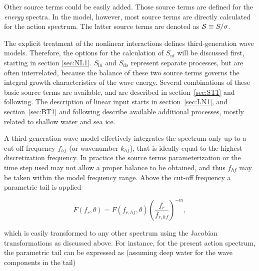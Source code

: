 \noindent
Other source terms could be easily added. Those source terms are defined for the
{\em energy} spectra. In the model, however, most source terms are directly
calculated for the action spectrum. The latter source terms are denoted as
${\cal S} \equiv S/\sigma$.

The explicit treatment of the nonlinear interactions defines third-generation wave
models. Therefore, the options for the calculation of $S_{\mathrm  nl}$ will be
discussed first, starting in section \ref{sec:NL1}. $S_{\mathrm  in}$ and $S_{\mathrm ds}$
represent separate processes, but are often interrelated,
because the balance of these two source terms governs the integral growth
characteristics of the wave energy. Several combinations of these basic source
terms are available, and are described in section~\ref{sec:ST1} and following.
The description of linear input starts in section~\ref{sec:LN1}, and
section~\ref{sec:BT1} and following describe available additional processes, mostly
related to shallow water and sea ice. 


A third-generation wave model effectively integrates the spectrum only up to a
cut-off frequency $f_{hf}$ (or wavenumber $k_{hf}$), that is ideally equal to the 
highest discretization frequency. In practice the source terms parameterization or the time step used may not allow a proper 
balance to be obtained, and thus $f_{hf}$  may be taken within the model frequency range. Above the cut-off frequency a
parametric tail is applied \citep[e.g.,][]{art:WAM88}


\begin{equation}
F(f_r,\theta) = F(f_{r,hf},\theta) \left ( \frac{f_r}{f_{r,hf}}
\right ) ^{-m} \label{eq:tail_E_f} ,
\end{equation}

\noindent
which is easily transformed to any other spectrum using the Jacobian
transformations as discussed above. For instance, for the present action
spectrum, the parametric tail can be expressed as (assuming deep water for the
wave components in the tail)


